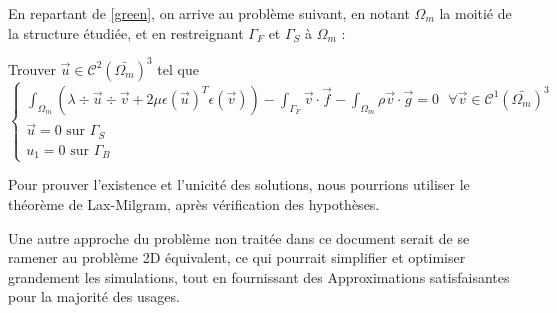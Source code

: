 En repartant de \ref{green}, on arrive au problème suivant, en notant $\Omega_m$ la moitié de la structure étudiée, et en restreignant $\Gamma_F$ et $\Gamma_S$ à $\Omega_m$ :

Trouver $\vec{u} \in \mathcal{C}^2(\bar{\Omega_m})^3$ tel que
\begin{equation}\label{moitie}
    \begin{cases}
        \displaystyle\int_{\Omega_m} (\lambda \div \vec{u} \div \vec{v} + 2\mu \epsilon(\vec{u})^T \epsilon(\vec{v})) - \int_{\Gamma_F} \vec{v} \cdot \vec{f} - \int_{\Omega_m} \rho \vec{v} \cdot \vec{g} = 0 \textrm{ } \forall \vec{v} \in \mathcal{C}^1(\bar{\Omega_m})^3\\
        \vec{u} = 0 \textrm{ sur } \Gamma_S\\
        u_1 = 0 \textrm{ sur } \Gamma_B
    \end{cases}
\end{equation}

Pour prouver l'existence et l'unicité des solutions, nous pourrions utiliser le théorème de Lax-Milgram, après vérification des hypothèses.

Une autre approche du problème non traitée dans ce document serait de se ramener au problème 2D équivalent, ce qui pourrait simplifier et optimiser grandement les simulations,
tout en fournissant des Approximations satisfaisantes pour la majorité des usages.
